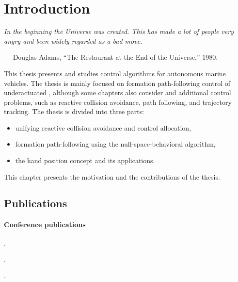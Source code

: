 \chapter{Introduction}
\label{chap:introduction}

\setlength{\epigraphwidth}{0.5\textwidth}
\epigraph{ \it
    In the beginning the Universe was created.
    This has made a lot of people very angry and been widely regarded as a bad move.
}{--- Douglas Adams, ``The Restaurant at the End of the Universe,'' 1980.}

This thesis presents and studies control algorithms for autonomous marine vehicles.
The thesis is mainly focused on formation path-following control of underactuated , although some chapters also consider  and additional control problems, such as reactive collision avoidance, path following, and trajectory tracking.
The thesis is divided into three parts:
\begin{itemize}
    \item unifying reactive collision avoidance and control allocation,
    \item formation path-following using the null-space-behavioral algorithm,
    \item the hand position concept and its applications.
\end{itemize}
This chapter presents the motivation and the contributions of the thesis.





\section{Publications}

\subsubsection{Conference publications}
\noindent \hspace*{1em} .

\vspace*{0.5em}

\noindent \hspace*{1em} .

\vspace*{0.5em}

\noindent \hspace*{1em}.


